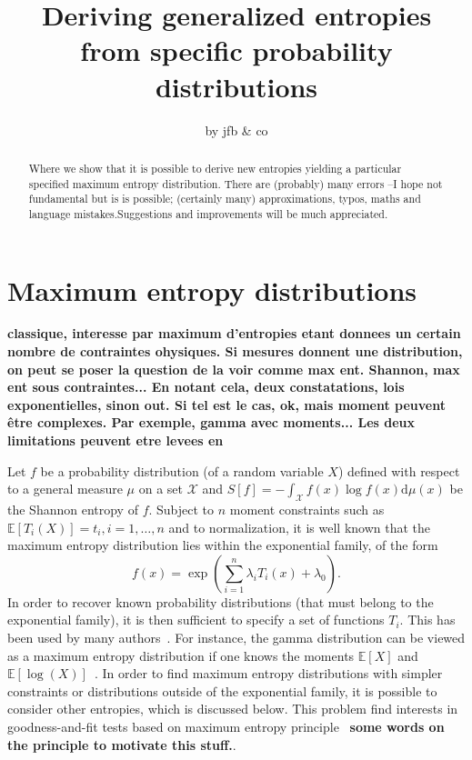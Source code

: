 \documentclass[english,sort&compress]{elsarticle}
\theoremstyle{definition}
\theoremstyle{plain}
\theoremstyle{plain}
\def\dmu{\mathrm{d}\mu}
\def\X{\mathcal{X}}
\newcommand{\Esp}[1]{\mathbb{E}\left[ #1 \right]}
\begin{document}

\title{Deriving generalized entropies from specific probability distributions}
\author{by jfb \& co \date{} }
\begin{abstract}
  Where  we  show  that it  is  possible  to  derive  new entropies  yielding  a
  particular specified  maximum entropy distribution. There  are (probably) many
  errors  --I  hope  not  fundamental  but  is  is  possible;  (certainly  many)
  approximations,   typos,   maths   and   language   mistakes.Suggestions   and
  improvements will be much appreciated.
\end{abstract}

\maketitle



\section{Maximum entropy distributions}
\label{sec:MaxEnt}

{\bf classique, interesse par maximum d'entropies etant donnees un certain nombre de contraintes ohysiques. Si mesures donnent une distribution, on peut se poser la question de la voir comme max ent. Shannon, max ent sous contraintes... En notant cela, deux constatations, lois exponentielles, sinon out. Si tel est le cas, ok, mais moment peuvent être complexes. Par exemple, gamma avec moments... Les deux limitations peuvent etre levees en }

Let $f$  be a probability distribution  (of a random variable  $X$) defined with
respect to  a general measure $\mu$  on a set  $\X$ and $\displaystyle S[f]  = -
\int_\X f(x) \log  f(x) \dmu(x)$ be the Shannon entropy of  $f$.  Subject to $n$
moment constraints  such as  $\Esp{T_i(X)} = t_i,  i =  1 , \ldots  , n$  and to
normalization,  it is  well known  that  the maximum  entropy distribution  lies
within the exponential family, of the form
%
\[
f(x) = \exp\left( \sum_{i=1}^n \lambda_i T_i(x) + \lambda_0 \right).
\]
%
In order  to recover  known probability distributions  (that must belong  to the
exponential family), it is then sufficient  to specify a set of functions $T_i$.
This has been used by  many authors~\cite{toto, Kap89, CovTho06}.  For instance,
the gamma  distribution can be viewed  as a maximum entropy  distribution if one
knows the moments $\Esp  X$ and $\Esp{\log(X)}$~\cite{Kap89, CovTho06, ParBer09,
  Gok75, Gok83}.   In order to  find maximum entropy distributions  with simpler
constraints or distributions  outside of the exponential family,  it is possible
to  consider  other entropies,  which  is  discussed  below. This  problem  find
interests    in    goodness-and-fit    tests    based   on    maximum    entropy
principle~\cite{Vas76, Gok83,  Girardin} {\bf\large some words  on the principle
  to motivate this stuff.}.
\end{document}
